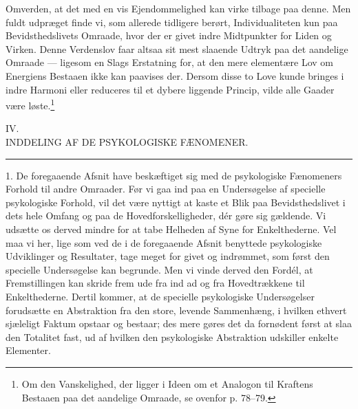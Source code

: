 \documentclass[12pt,a4paper,openany]{book}
\newcommand{\opage}[1]{\marginnote{\footnotesize\textit{[#1]}}}
\begin{document}
Omverden, at det med en vis Ejendommelighed kan virke tilbage paa denne.
Men fuldt udpræget finde vi, som allerede tidligere berørt,
Individualiteten kun paa Bevidsthedslivets Omraade, hvor der er givet
indre Midtpunkter for Liden og Virken. Denne Verdenslov faar altsaa sit
mest slaaende Udtryk paa det aandelige Omraade --- ligesom en Slags
Erstatning for, at den mere elementære Lov om Energiens Bestaaen ikke
kan paavises der. Dersom disse to Love kunde bringes i indre Harmoni
eller reduceres til et dybere liggende Princip, vilde alle Gaader være
løste.\footnote[3]{Om den Vanskelighed, der ligger i Ideen om et
Analogon til Kraftens Bestaaen paa det aandelige Omraade, se ovenfor p.
78--79.}

\clearpage
\opage{103}\begin{center}IV.\\[4pt] INDDELING AF DE PSYKOLOGISKE FÆNOMENER.\\[2pt]\rule{1.5cm}{0.4pt}\end{center}

1. De foregaaende Afsnit have beskæftiget sig med de psykologiske
Fænomeners Forhold til andre Omraader. Før vi gaa ind paa en
Undersøgelse af specielle psykologiske Forhold, vil det være nyttigt at
kaste et Blik paa Bevidsthedslivet i dets hele Omfang og paa de
Hovedforskelligheder, dér gøre sig gældende. Vi udsætte os derved mindre
for at tabe Helheden af Syne for Enkelthederne. Vel maa vi her, lige som
ved de i de foregaaende Afsnit benyttede psykologiske Udviklinger og
Resultater, tage meget for givet og indrømmet, som først den specielle
Undersøgelse kan begrunde. Men vi vinde derved den Fordél, at
Fremstillingen kan skride frem ude fra ind ad og fra Hovedtrækkene til
Enkelthederne. Dertil kommer, at de specielle psykologiske Undersøgelser
forudsætte en Abstraktion fra den store, levende Sammenhæng, i hvilken
ethvert sjæleligt Faktum opstaar og bestaar; des mere gøres det da
fornødent først at slaa den Totalitet fast, ud af hvilken den
psykologiske Abstraktion udskiller enkelte Elementer.
\end{document}
